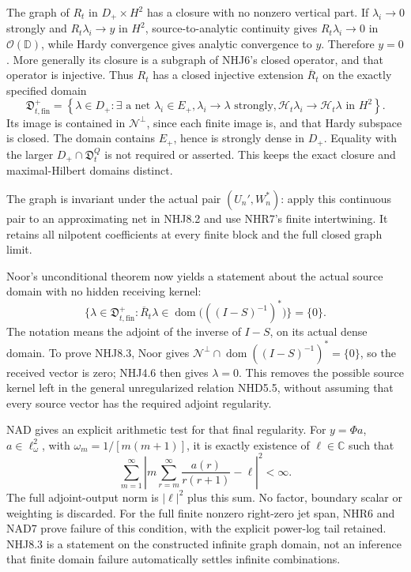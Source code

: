 The graph of \(R_t\) in \(D_+\times H^2\) has a closure with no nonzero
vertical part. If \(\lambda_i\to0\) strongly and \(R_t\lambda_i\to y\)
in \(H^2\), source-to-analytic continuity gives \(R_t\lambda_i\to0\) in
\(\mathcal O(\mathbb D)\), while Hardy convergence gives analytic
convergence to \(y\). Therefore \(y=0\). More generally its closure is a
subgraph of NHJ6's closed operator, and that operator is injective. Thus
\(R_t\) has a closed injective extension \(\overline R_t\) on the
exactly specified domain \[
\mathfrak D_{t,\mathrm{fin}}^+=
\left\{\lambda\in D_+:\exists\text{ a net }\lambda_i\in E_+,
\lambda_i\to\lambda\text{ strongly},
\mathcal H_t\lambda_i\to\mathcal H_t\lambda\text{ in }H^2\right\}.
\tag{NHJ8.2}
\] Its image is contained in \(\mathcal N^\perp\), since each finite
image is, and that Hardy subspace is closed. The domain contains
\(E_+\), hence is strongly dense in \(D_+\). Equality with the larger
\(D_+\cap\mathfrak D_t^Q\) is not required or asserted. This keeps the
exact closure and maximal-Hilbert domains distinct.

The graph is invariant under the actual pair \((U_n',W_n^*)\): apply
this continuous pair to an approximating net in NHJ8.2 and use NHR7's
finite intertwining. It retains all nilpotent coefficients at every
finite block and the full closed graph limit.

Noor's unconditional theorem now yields a statement about the actual
source domain with no hidden receiving kernel: \[
\boxed{\{\lambda\in\mathfrak D_{t,\mathrm{fin}}^+:
\overline R_t\lambda\in\operatorname{dom}\bigl(((I-S)^{-1})^*\bigr)\}=\{0\}.}
\tag{NHJ8.3}
\] The notation means the adjoint of the inverse of \(I-S\), on its
actual dense domain. To prove NHJ8.3, Noor gives
\(\mathcal N^\perp\cap\operatorname{dom}( (I-S)^{-1})^*=\{0\}\), so the
received vector is zero; NHJ4.6 then gives \(\lambda=0\). This removes
the possible source kernel left in the general unregularized relation
NHD5.5, without assuming that every source vector has the required
adjoint regularity.

NAD gives an explicit arithmetic test for that final regularity. For
\(y=\Phi a\), \(a\in\ell^2_\omega\), with \(\omega_m=1/[m(m+1)]\), it is
exactly existence of \(\ell\in\mathbb C\) such that \[
\sum_{m=1}^\infty\left|
m\sum_{r=m}^\infty\frac{a(r)}{r(r+1)}-\ell\right|^2<\infty.
\tag{NHJ8.4}
\] The full adjoint-output norm is \(|\ell|^2\) plus this sum. No
factor, boundary scalar or weighting is discarded. For the full finite
nonzero right-zero jet span, NHR6 and NAD7 prove failure of this
condition, with the explicit power-log tail retained. NHJ8.3 is a
statement on the constructed infinite graph domain, not an inference
that finite domain failure automatically settles infinite combinations.

